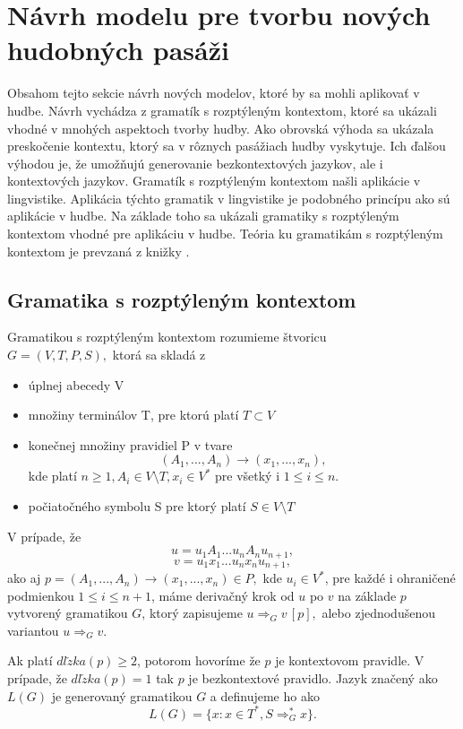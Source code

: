 \chapter{Návrh modelu pre tvorbu nových hudobných pasáži}
\label{chap:app}
Obsahom tejto sekcie návrh nových modelov, ktoré by sa mohli aplikovať v hudbe. Návrh vychádza z gramatík s rozptýleným kontextom, ktoré sa ukázali vhodné v mnohých aspektoch tvorby hudby. Ako obrovská výhoda sa ukázala preskočenie kontextu, ktorý sa v rôznych pasážiach hudby vyskytuje. Ich ďalšou výhodou je, že umožňujú generovanie bezkontextových jazykov, ale i kontextových jazykov. Gramatík s rozptýleným kontextom našli aplikácie v lingvistike. Aplikácia týchto gramatik v lingvistike je podobného princípu ako sú aplikácie v hudbe. Na základe toho sa ukázali gramatiky s rozptýleným kontextom vhodné pre aplikáciu v hudbe. Teória ku gramatikám s rozptýleným kontextom je prevzaná z knižky \cite{FITPUB8997}.

\section{Gramatika s rozptýleným kontextom}
\begin{definition}
Gramatikou s rozptýleným kontextom rozumieme štvoricu \\ $G = (V,T,P,S),$ ktorá sa skladá z
\begin{itemize}\itemsep0.05em
    \item úplnej abecedy V 
    \item množiny terminálov T, pre ktorú platí $T \subset V$
    \item konečnej množiny pravidiel P v tvare $$(A_1, ..., A_n) \rightarrow (x_1, ..., x_n),$$ kde platí $n \geq 1, A_i \in V \setminus T, x_i \in V^*$ pre všetký i $1 \leq i \leq n.$
    \item počiatočného symbolu S pre ktorý platí $S \in V \setminus T$
\end{itemize}
\end{definition}

V prípade, že $$u = u_1A_1...u_nA_nu_{n+1},$$$$v = u_1x_1...u_nx_nu_{n+1},$$ ako aj $p = (A_1, ..., A_n) \rightarrow (x_1, ..., x_n) \in P,$ kde $u_i \in V^*$, pre každé i ohraničené podmienkou $1 \leq i \leq n + 1$, máme derivačný krok od $u$ po $v$ na základe $p$ vytvorený gramatikou $G$, ktorý zapisujeme $u \Rightarrow_G v \, [p],$ alebo zjednodušenou variantou $u \Rightarrow_G v$.

Ak platí $dl\check{z}ka(p) \geq 2$, potorom hovoríme že $p$ je kontextovom pravidle. V prípade, že $dl\check{z}ka(p) = 1$ tak $p$ je bezkontextové pravidlo. Jazyk značený ako $L(G)$ je generovaný gramatikou $G$ a definujeme ho ako $$L(G) = \{x: x \in T^*, S \Rightarrow^*_G x\}.$$

